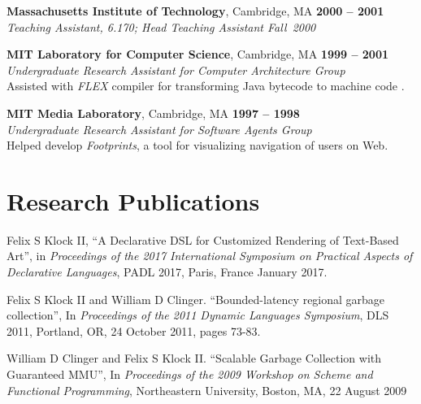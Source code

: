 \documentclass[margin,line,draft]{res}
\def\noneed#1{}
\def\coursetitle#1{\textsl{#1}}
\newcommand{\mysidestyle}{\sc}
\begin{document}
\begin{resume}
    \textbf{Massachusetts Institute of Technology}, Cambridge, MA \hfill \textbf{2000 -- 2001} \\\vspace{1mm}%
    \textsl{Teaching Assistant, 6.170; Head Teaching Assistant Fall~2000}
    \noneed{Assistant for 6.170, \noneed{\coursetitle{Laboratory in Software Engineering},}
    Spring, Fall~2000, Spring~2001. {Head Teaching Assistant Fall~2000.}}

    \textbf{MIT Laboratory for Computer Science}, Cambridge, MA  \hfill \textbf{1999 -- 2001}\\\vspace{1mm}%
    \textsl{Undergraduate Research Assistant for Computer Architecture Group}\\
    Assisted with \emph{FLEX} compiler {for transforming
    Java bytecode to machine code}
    .

    \textbf{MIT Media Laboratory}, Cambridge, MA \hfill \textbf{1997 -- 1998}\\\vspace{1mm}%
    \textsl{Undergraduate Research Assistant for Software Agents Group} \\
    Helped develop \emph{Footprints}, a tool for visualizing navigation of 
    users on Web.


    \section{\mysidestyle Research Publications}

    Felix S Klock II, ``A Declarative DSL for Customized Rendering of Text-Based Art'', in \textsl{Proceedings of the 2017 International Symposium on Practical Aspects of Declarative Languages}, PADL 2017, Paris, France January 2017.

    Felix S Klock II and William D Clinger.  ``Bounded-latency regional garbage collection'', In \textsl{Proceedings of the 2011 Dynamic Languages Symposium}, DLS 2011, Portland, OR, 24 October 2011, pages 73-83.

    William D Clinger and Felix S Klock II. ``Scalable Garbage Collection with Guaranteed MMU'', In \textsl{Proceedings of the 2009 Workshop on Scheme and Functional Programming}, Northeastern University, Boston, MA, 22 August 2009


\end{resume}
\end{document}
